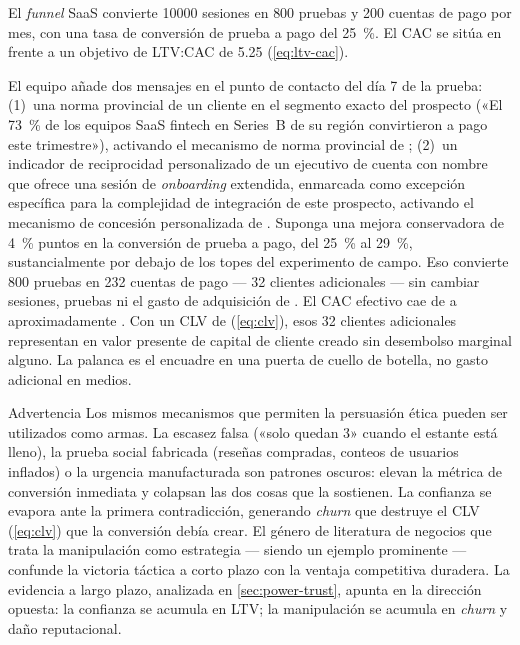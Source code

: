 \begin{example}
El \emph{funnel} SaaS convierte \num{10000} sesiones en \num{800} pruebas y \num{200} cuentas
de pago por mes, con una tasa de conversión de prueba a pago del \qty{25}{\percent}. El CAC
se sitúa en  frente a un objetivo de LTV:CAC de \num{5.25}\texttimes{}
(\cref{eq:ltv-cac}).

El equipo añade dos mensajes en el punto de contacto del día 7 de la prueba: (1)~una norma
provincial de un cliente en el segmento exacto del prospecto («El \qty{73}{\percent} de los
equipos SaaS fintech en Series~B de su región convirtieron a pago este trimestre»), activando
el mecanismo de norma provincial de \textcite{goldstein2008field}; (2)~un indicador de
reciprocidad personalizado de un ejecutivo de cuenta con nombre que ofrece una sesión de
\emph{onboarding} extendida, enmarcada como excepción específica para la complejidad de
integración de este prospecto, activando el mecanismo de concesión personalizada de
\textcite{strohmetz2002field}. Suponga una mejora conservadora de \qty{4}{\percent} puntos en
la conversión de prueba a pago, del \qty{25}{\percent} al \qty{29}{\percent}, sustancialmente
por debajo de los topes del experimento de campo. Eso convierte \num{800} pruebas en \num{232}
cuentas de pago --- \num{32} clientes adicionales --- sin cambiar sesiones, pruebas ni el gasto
de adquisición de . El CAC efectivo cae de  a aproximadamente
. Con un CLV de  (\cref{eq:clv}), esos \num{32} clientes adicionales
representan  en valor presente de capital de cliente creado sin desembolso
marginal alguno. La palanca es el encuadre en una puerta de cuello de botella, no gasto
adicional en medios.
\end{example}

\begin{admonition}{Advertencia}
Los mismos mecanismos que permiten la persuasión ética pueden ser utilizados como armas. La
escasez falsa («solo quedan 3» cuando el estante está lleno), la prueba social fabricada
(reseñas compradas, conteos de usuarios inflados) o la urgencia manufacturada son patrones
oscuros: elevan la métrica de conversión inmediata y colapsan las dos cosas que la sostienen.
La confianza se evapora ante la primera contradicción, generando \emph{churn} que destruye
el CLV (\cref{eq:clv}) que la conversión debía crear. El género de literatura de negocios que
trata la manipulación como estrategia --- \textcite{greene1998laws} siendo un ejemplo
prominente --- confunde la victoria táctica a corto plazo con la ventaja competitiva duradera.
La evidencia a largo plazo, analizada en \cref{sec:power-trust}, apunta en la dirección
opuesta: la confianza se acumula en LTV; la manipulación se acumula en \emph{churn} y daño
reputacional.
\end{admonition}


